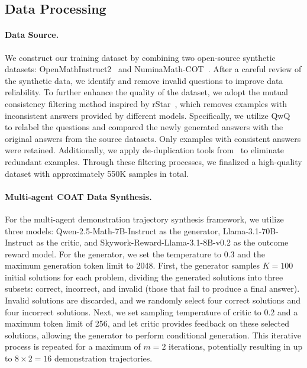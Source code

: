 \subsection{Data Processing}
\paragraph{Data Source.}
We construct our training dataset by combining two open-source synthetic datasets: OpenMathInstruct2~\cite{openmathinstruct2} and NuminaMath-COT~\cite{numina}. After a careful review of the synthetic data, we identify and remove invalid questions to improve data reliability.
To further enhance the quality of the dataset, we adopt the mutual consistency filtering method inspired by rStar~\cite{qi2024mutual}, which removes examples with inconsistent answers provided by different models. Specifically, we utilize QwQ~\cite{qwq-32b-preview} to relabel the questions and compared the newly generated answers with the original answers from the source datasets. Only examples with consistent answers were retained. Additionally, we apply de-duplication tools from~\cite{Stack} to eliminate redundant examples. Through these filtering processes, we finalized a high-quality dataset with approximately 550K samples in total.

\paragraph{Multi-agent COAT Data Synthesis.}
For the multi-agent demonstration trajectory synthesis framework, we utilize three models: Qwen-2.5-Math-7B-Instruct as the generator, Llama-3.1-70B-Instruct as the critic, and Skywork-Reward-Llama-3.1-8B-v0.2 as the outcome reward model. For the generator, we set the temperature to 0.3 and the maximum generation token limit to 2048. First, the generator samples $K=100$ initial solutions for each problem, dividing the generated solutions into three subsets: correct, incorrect, and invalid (those that fail to produce a final answer). Invalid solutions are discarded, and we randomly select four correct solutions and four incorrect solutions. Next, we set sampling temperature of critic to 0.2 and a maximum token limit of 256, and let critic provides feedback on these selected solutions, allowing the generator to perform conditional generation. This iterative process is repeated for a maximum of $m=2$ iterations, potentially resulting in up to $8 \times 2 = 16$ demonstration trajectories.

